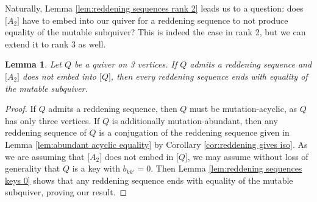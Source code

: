 \documentclass[11pt, letterpaper]{amsart}
\newcommand{\hide}[1]{}
\newtheorem{lemma}[theorem]{Lemma}
\theoremstyle{definition}
\numberwithin{equation}{section}
\begin{document}
Naturally, Lemma \ref{lem:reddening sequences rank 2} leads us to a question: does $\big [A_2\big ]$ have to embed into our quiver for a reddening sequence to not produce equality of the mutable subquiver?
This is indeed the case in rank 2, but we can extend it to rank 3 as well.

\begin{lemma} \label{lem:reddening sequences rank 3}
    Let $Q$ be a quiver on 3 vertices.
    If $Q$ admits a reddening sequence and $\big [A_2 \big ]$ does not embed into $\big [ Q \big ]$, then every reddening sequence ends with equality of the mutable subquiver.
\end{lemma}

\begin{proof}
    If $Q$ admits a reddening sequence, then $Q$ must be mutation-acyclic, as $Q$ has only three vertices.
    If $Q$ is additionally mutation-abundant, then any reddening sequence of $Q$ is a conjugation of the reddening sequence given in Lemma \ref{lem:abundant acyclic equality} by Corollary \ref{cor:reddening gives iso}.
    As we are assuming that $\big [A_2\big ]$ does not embed in $\big [ Q \big ]$, we may assume without loss of generality that $Q$ is a key with $b_{kk'}= 0$.
    Then Lemma \ref{lem:reddening sequences keys 0} shows that any reddening sequence ends with equality of the mutable subquiver, proving our result.
    \hide{ as given in Figure \ref{fig:rank 3 proof}. Note that vertex $2$ is a source.
    \begin{figure}[ht]
        \centering
        \[\begin{tikzcd}[every arrow/.append style = {-{Stealth}}]
            1 & 2 & 3 
            \arrow[from=1-2,to=1-1,"a"']
            \arrow[from=1-2,to=1-3,"b"]
        \end{tikzcd}\]
        \caption{$Q$ for $a,b \geq 2$}
        \label{fig:rank 3 proof}
    \end{figure}

}
\end{proof}
\end{document}
